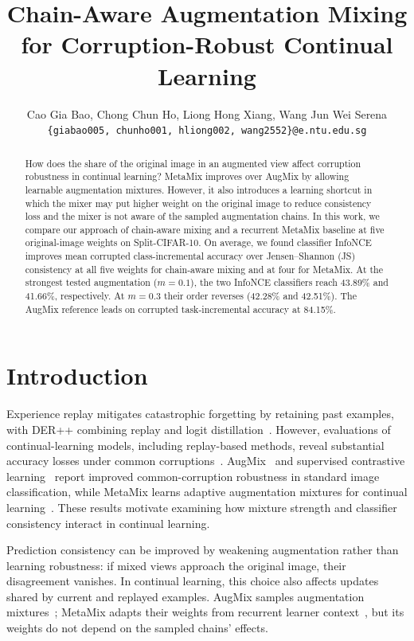 \documentclass[10pt,twocolumn,letterpaper]{article}
\title{Chain-Aware Augmentation Mixing for Corruption-Robust Continual Learning}
\author{Cao Gia Bao, Chong Chun Ho, Liong Hong Xiang, Wang Jun Wei Serena \\ {\tt\small \{giabao005, chunho001, hliong002, wang2552\}@e.ntu.edu.sg}}
\begin{document}
\raggedbottom
\maketitle
\begin{abstract}
      How does the share of the original image in an augmented view affect corruption robustness in continual learning? MetaMix improves over AugMix by allowing learnable augmentation mixtures. However, it also introduces a learning shortcut in which the mixer may put higher weight on the original image to reduce consistency loss and the mixer is not aware of the sampled augmentation chains. In this work, we compare our approach of chain-aware mixing and a recurrent MetaMix baseline at five original-image weights on Split-CIFAR-10. On average, we found classifier InfoNCE improves mean corrupted class-incremental accuracy over Jensen--Shannon (JS) consistency at all five weights for chain-aware mixing and at four for MetaMix. At the strongest tested augmentation ($m=0.1$), the two InfoNCE classifiers reach 43.89\% and 41.66\%, respectively. At $m=0.3$ their order reverses (42.28\% and 42.51\%). The AugMix reference leads on corrupted task-incremental accuracy at 84.15\%.

\end{abstract}

\section{Introduction}
Experience replay mitigates catastrophic forgetting by retaining past examples, with DER++ combining replay and logit distillation~\cite{buzzega2020dark}. However, evaluations of continual-learning models, including replay-based methods, reveal substantial accuracy losses under common corruptions~\cite{wang2023metamix}. AugMix~\cite{hendrycks2020augmix} and supervised contrastive learning~\cite{khosla2020supervised} report improved common-corruption robustness in standard image classification, while MetaMix learns adaptive augmentation mixtures for continual learning~\cite{wang2023metamix}. These results motivate examining how mixture strength and classifier consistency interact in continual learning.

Prediction consistency can be improved by weakening augmentation rather than learning robustness: if mixed views approach the original image, their disagreement vanishes. In continual learning, this choice also affects updates shared by current and replayed examples. AugMix samples augmentation mixtures~\cite{hendrycks2020augmix}; MetaMix adapts their weights from recurrent learner context~\cite{wang2023metamix}, but its weights do not depend on the sampled chains' effects.
\end{document}
